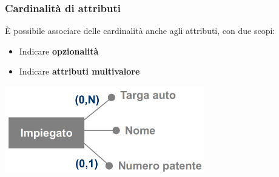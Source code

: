 \documentclass[12pt]{article}
\begin{document}
\subsubsection{Cardinalità di attributi}
È possibile associare delle cardinalità anche agli attributi, con due scopi:
\begin{itemize}
    \item Indicare \textbf{opzionalità}
    \item Indicare \textbf{attributi multivalore}
\end{itemize}
\begin{center}
    \includegraphics[width = 0.65\textwidth]{Images/33.PNG}
\end{center}
\end{document}
